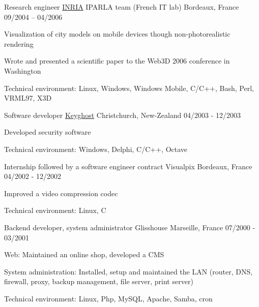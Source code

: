 \begin{cventries}
  \cventry
    {Research engineer}
    {\href{https://www.inria.fr/}{INRIA} IPARLA team (French IT lab)}
    {Bordeaux, France}
    {09/2004 – 04/2006}
    {
      \begin{cvitems}
        \item {Visualization of city models on mobile devices though
            non-photorealistic rendering}
        \item {Wrote and presented a scientific paper to the Web3D 2006
            conference in Washington}
        \item {Technical environment: Linux, Windows, Windows Mobile, C/C++,
            Bash, Perl, VRML97, X3D}
      \end{cvitems}
    }

  \cventry
    {Software developer}
    {\href{https://www.keyghost.com/}{Keyghost}}
    {Christchurch, New-Zealand}
    {04/2003 - 12/2003}
    {
      \begin{cvitems}
        \item {Developed security software}
		\item {Technical environment: Windows, Delphi, C/C++, Octave}
      \end{cvitems}
    }

  \cventry
    {Internship followed by a software engineer contract}
    {Visualpix}
    {Bordeaux, France}
    {04/2002 - 12/2002}
    {
      \begin{cvitems}
        \item {Improved a video compression codec}
		\item {Technical environment: Linux, C}
      \end{cvitems}
    }

  \cventry
    {Backend developer, system administrator}
    {Glisshouse}
    {Marseille, France}
    {07/2000 - 03/2001}
    {
      \begin{cvitems}
        \item {Web: Maintained an online shop, developed a CMS}
        \item {System administration: Installed, setup and maintained the LAN
            (router, DNS, firewall, proxy, backup management, file server,
            print server)}
		\item {Technical environment: Linux, Php, MySQL, Apache, Samba, cron}
      \end{cvitems}
    }

\end{cventries}
